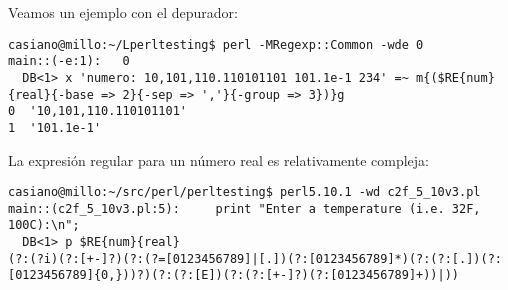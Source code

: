 Veamos un ejemplo con el depurador:
\begin{verbatim}
casiano@millo:~/Lperltesting$ perl -MRegexp::Common -wde 0
main::(-e:1):   0
  DB<1> x 'numero: 10,101,110.110101101 101.1e-1 234' =~ m{($RE{num}{real}{-base => 2}{-sep => ','}{-group => 3})}g
0  '10,101,110.110101101'
1  '101.1e-1'
\end{verbatim}

La expresión regular para un número real es 
relativamente compleja:

\begin{verbatim}
casiano@millo:~/src/perl/perltesting$ perl5.10.1 -wd c2f_5_10v3.pl
main::(c2f_5_10v3.pl:5):     print "Enter a temperature (i.e. 32F, 100C):\n";
  DB<1> p $RE{num}{real}
(?:(?i)(?:[+-]?)(?:(?=[0123456789]|[.])(?:[0123456789]*)(?:(?:[.])(?:[0123456789]{0,}))?)(?:(?:[E])(?:(?:[+-]?)(?:[0123456789]+))|))
\end{verbatim}

